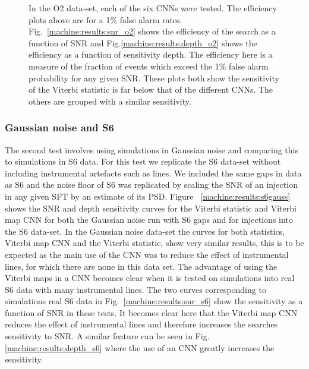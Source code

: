 \begin{figure}[h]
	\caption[O2 results from SOAP and \gls{CNN} search.]{\label{machine:results:o2}  In the O2 data-set, each of the six \glspl{CNN} were tested. The efficiency plots above are for a 1\% false alarm rates.
	Fig.~\ref{machine:results:snr_o2} shows the efficiency of the search as a function of \gls{SNR} and Fig.\ref{machine:results:depth_o2} shows the efficiency as a function of sensitivity depth.
	The efficiency here is a measure of the fraction of events which exceed the 1\% false alarm probability for any given \gls{SNR}.
	These plots both show the sensitivity of the Viterbi statistic is far below that of the different \glspl{CNN}. 
	The others are grouped with a similar sensitivity.}
	
\end{figure}



\subsubsection{Gaussian noise and S6}

%
The second test involves using simulations in Gaussian noise and comparing this to simulations in S6 data.
 For this test we replicate the S6
data-set without including instrumental artefacts such as lines. We included
the same gaps in data as S6 and the noise floor of S6 was replicated by scaling
the \gls{SNR} of an injection in any given \gls{SFT} by an estimate of its \gls{PSD}. 
Figure ~\ref{machine:results:s6gauss}
shows the \gls{SNR} and depth sensitivity curves for the Viterbi statistic and Viterbi map \gls{CNN}
for both the Gaussian noise run with S6 gaps and for injections into the S6
data-set. In the Gaussian noise data-set the curves for both statistics,
Viterbi map \gls{CNN} and the Viterbi statistic, show very similar
results, this is to be expected as the main use of the \gls{CNN} was to reduce
the effect of instrumental lines, for which there are none in this data set.
The advantage of using the Viterbi maps in a \gls{CNN} becomes clear when it is
tested on simulations into real S6 data with many instrumental lines.
The two curves corresponding to simulations real S6 data in Fig.~\ref{machine:results:snr_s6} show the sensitivity as a function of \gls{SNR} in these tests. It becomes clear here that the Viterbi map \gls{CNN} reduces the effect of instrumental
lines and therefore increases the searches sensitivity to \gls{SNR}. 
A similar feature can be seen in Fig.\ref{machine:results:depth_s6} where the use of an \gls{CNN} greatly increases the sensitivity.

